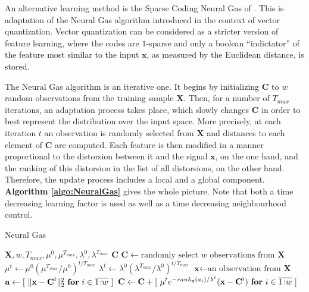 \documentclass[12pt,a4paper,oneside,english]{UPBThesis}
\newcommand{\hcrange}[2]{\overline{{#1}\colon\!\!{#2}}}
\begin{document}
An alternative learning method is the Sparse Coding Neural Gas of \cite{sparse-coding-neural-gas-1,sparse-coding-neural-gas-2,sparse-coding-neural-gas-3, sparse-coding-neural-gas-4}. This is adaptation of the Neural Gas \cite{neural-gas-1,neural-gas-2} algorithm introduced in the context of vector quantization. Vector quantization can be considered as a stricter version of feature learning, where the codes are $1$-sparse and only a boolean ``indictator'' of the feature most similar to the input $\textbf{x}$, as measured by the Euclidean distance, is stored.

The Neural Gas algorithm is an iterative one. It begins by initializing $\textbf{C}$ to $w$ random observations from the training sample $\textbf{X}$. Then, for a number of $T_{max}$ iterations, an adaptation process takes place, which slowly changes $\textbf{C}$ in order to best represent the distribution over the input space. More precisely, at each iteration $t$ an observation is randomly selected from $\textbf{X}$ and distances to each element of $\textbf{C}$ are computed. Each feature is then modified in a manner proportional to the distorsion between it and the signal $\textbf{x}$, on the one hand, and the ranking of this distorsion in the list of all distorsions, on the other hand. Therefore, the update process includes a local and a global component. \textbf{Algorithm \ref{algo:NeuralGas}} gives the whole picture. Note that both a time decreasing learning factor is used as well as a time decreasing neighbourhood control. 

\begin{algorithm}
\caption{Neural Gas}
\label{algo:NeuralGas}
\begin{algorithmic}
\Require $\textbf{X},w,T_{max},\mu^0,\mu^{T_{max}},\lambda^0,\lambda^{T_{max}}$
\Ensure $\textbf{C}$
\State $\textbf{C} \gets \mbox{randomly select $w$ observations from $\textbf{X}$}$
\For {$t = \hcrange{1}{T_{max}}$}
\State $\mu^t \gets \mu^0 (\mu^{T_{max}} / \mu^0)^{t / T_{max}}$ 
\State $\lambda^t \gets \lambda^0 (\lambda^{T_{max}} / \lambda^0)^{t / T_{max}}$ 
\State $\textbf{x} \gets \text{an observation from $\textbf{X}$}$
\State $\textbf{a} \gets [ ~ \|\textbf{x} - \textbf{C}^i\|_2^2 ~ \mbox{\textbf{for} $i \in \hcrange{1}{w}$} ~ ]$
\State $\textbf{C} \gets \textbf{C} + [ ~ \mu^t e^{-rank_{\textbf{a}}(a_i) / \lambda^t} (\textbf{x} - \textbf{C}^i) ~ \mbox{\textbf{for} $i \in \hcrange{1}{w}$} ~ ]$
\EndFor
\end{algorithmic}
\end{algorithm}
\end{document}
